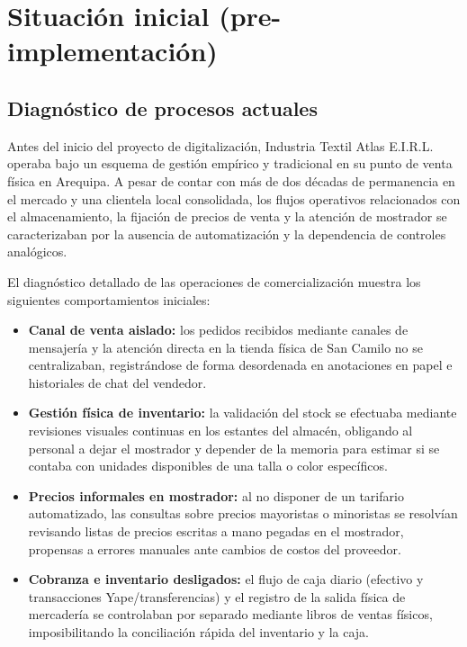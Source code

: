 \section{Situación inicial (pre-implementación)}

\subsection{Diagnóstico de procesos actuales}
\begin{indentedsubsection}
Antes del inicio del proyecto de digitalización, Industria Textil Atlas E.I.R.L. operaba bajo un esquema de gestión empírico y tradicional en su punto de venta física en Arequipa. A pesar de contar con más de dos décadas de permanencia en el mercado y una clientela local consolidada, los flujos operativos relacionados con el almacenamiento, la fijación de precios de venta y la atención de mostrador se caracterizaban por la ausencia de automatización y la dependencia de controles analógicos.

El diagnóstico detallado de las operaciones de comercialización muestra los siguientes comportamientos iniciales:
\begin{itemize}
    \item \textbf{Canal de venta aislado:} los pedidos recibidos mediante canales de mensajería y la atención directa en la tienda física de San Camilo no se centralizaban, registrándose de forma desordenada en anotaciones en papel e historiales de chat del vendedor.
    \item \textbf{Gestión física de inventario:} la validación del stock se efectuaba mediante revisiones visuales continuas en los estantes del almacén, obligando al personal a dejar el mostrador y depender de la memoria para estimar si se contaba con unidades disponibles de una talla o color específicos.
    \item \textbf{Precios informales en mostrador:} al no disponer de un tarifario automatizado, las consultas sobre precios mayoristas o minoristas se resolvían revisando listas de precios escritas a mano pegadas en el mostrador, propensas a errores manuales ante cambios de costos del proveedor.
    \item \textbf{Cobranza e inventario desligados:} el flujo de caja diario (efectivo y transacciones Yape/transferencias) y el registro de la salida física de mercadería se controlaban por separado mediante libros de ventas físicos, imposibilitando la conciliación rápida del inventario y la caja.
\end{itemize}
\end{indentedsubsection}

